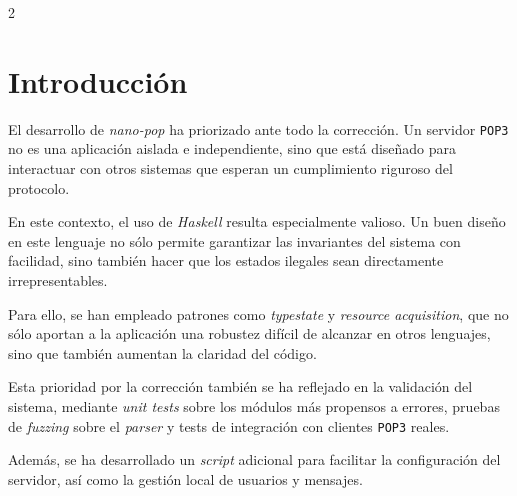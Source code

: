 \documentclass[a4paper]{CSMakotoTechnicalReport}
\begin{document}
\begin{multicols}{2} %


\setcounter{tocdepth}{2}
\tableofcontents


\section*{Introducción}

El desarrollo de \textit{nano-pop} ha priorizado ante todo la corrección. Un servidor \texttt{POP3} no es una aplicación aislada e independiente, sino que está diseñado para interactuar con otros sistemas que esperan un cumplimiento riguroso del protocolo.

En este contexto, el uso de \textit{Haskell} resulta especialmente valioso. Un buen diseño en este lenguaje no sólo permite garantizar las invariantes del sistema con facilidad, sino también hacer que los estados ilegales sean directamente irrepresentables.

Para ello, se han empleado patrones como \textit{typestate} y \textit{resource acquisition}, que no sólo aportan a la aplicación una robustez difícil de alcanzar en otros lenguajes, sino que también aumentan la claridad del código.

Esta prioridad por la corrección también se ha reflejado en la validación del sistema, mediante \textit{unit tests} sobre los módulos más propensos a errores, pruebas de \textit{fuzzing} sobre el \textit{parser} y tests de integración con clientes \texttt{POP3} reales.

Además, se ha desarrollado un \textit{script} adicional para facilitar la configuración del servidor, así como la gestión local de usuarios y mensajes.


\end{multicols} %
\newpage
\setcounter{page}{1}

\end{document}
